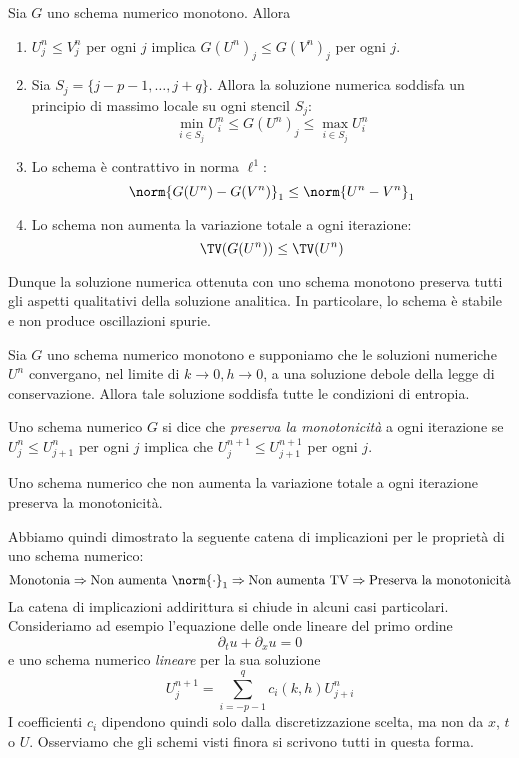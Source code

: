 \begin{teor}
Sia $G$ uno schema numerico monotono. Allora
\begin{enumerate}
\item $U_j^n \leq V_j^n$ per ogni $j$ implica $G(U^n)_j \leq G(V^n)_j$ per ogni $j$.
\item Sia $S_j = \{ j-p-1, \dots, j+q \}$. Allora la soluzione numerica
	soddisfa un principio di massimo locale su ogni stencil $S_j$:
	\[
	\min_{i \in S_j} U_i^n \leq G(U^n)_j \leq \max_{i \in S_j} U_i^n
	\]
\item Lo schema è contrattivo in norma $\ell^1$:
	\[
	\norm{G(U^n)-G(V^n)}_1 \leq \norm{U^n-V^n}_1
	\]
\item Lo schema non aumenta la variazione totale a ogni iterazione:
	\[
	\TV(G(U^n)) \leq \TV(U^n)
	\]
\end{enumerate}
\end{teor}

\noindent Dunque la soluzione numerica ottenuta con uno schema
monotono preserva tutti gli aspetti qualitativi della soluzione analitica.
In particolare, lo schema è stabile e non produce oscillazioni spurie.

\begin{teor}
Sia $G$ uno schema numerico monotono e supponiamo che le soluzioni numeriche
$U^n$ convergano, nel limite di $k \to 0, h \to 0$, a una soluzione debole
della legge di conservazione. Allora tale soluzione soddisfa tutte le
condizioni di entropia.
\end{teor}

\noindent Uno schema numerico $G$ si dice che \emph{preserva la monotonicità}
a ogni iterazione se $U_j^n \leq U_{j+1}^n$ per ogni $j$ implica che
$U_j^{n+1} \leq U_{j+1}^{n+1}$ per ogni $j$.

\begin{teor}
Uno schema numerico che non aumenta la variazione totale a ogni iterazione
preserva la monotonicità.
\end{teor}

\noindent Abbiamo quindi dimostrato la seguente catena di implicazioni
per le proprietà di uno schema numerico:
\begin{equation} \label{eq:catena}
\text{Monotonia}
\Rightarrow \text{Non aumenta $\norm{\cdot}_1$}
\Rightarrow \text{Non aumenta TV}
\Rightarrow \text{Preserva la monotonicità}
\end{equation}
La catena di implicazioni addirittura si chiude in alcuni casi particolari.
Consideriamo ad esempio l'equazione delle onde lineare del primo ordine
\begin{equation} \label{eq:onde-lineare-1D}
\partial_t u + \partial_x u = 0
\end{equation}
e uno schema numerico \emph{lineare} per la sua soluzione
\[
U_j^{n+1} = \sum_{i = -p-1}^q c_i(k,h) U_{j+i}^n
\]
I coefficienti $c_i$ dipendono quindi solo dalla discretizzazione scelta,
ma non da $x$, $t$ o $U$. Osserviamo che gli schemi visti finora si scrivono
tutti in questa forma.


